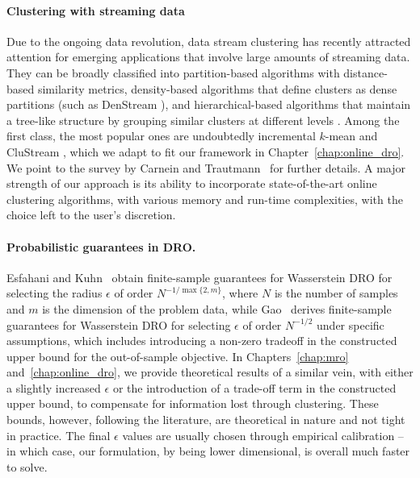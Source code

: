 \paragraph{Clustering with streaming data}
Due to the ongoing data revolution, data stream clustering has recently attracted attention for emerging applications that involve large amounts of streaming data.
They can be broadly classified into partition-based algorithms with distance-based similarity metrics, density-based algorithms that define clusters as dense partitions (such as DenStream \cite{cao2006density}), and hierarchical-based algorithms that maintain a tree-like structure by grouping similar clusters at different levels \cite{murtagh2012algorithms}. Among the first class, the most popular ones are undoubtedly incremental $k$-mean \cite{aaron2014dynamic} and CluStream \cite{clustream}, which we adapt to fit our framework in Chapter~\ref{chap:online_dro}.
We point to the survey by Carnein and Trautmann~\cite{streaming} for further details. 
A major strength of our approach is its ability to incorporate state-of-the-art online clustering algorithms, with various memory and run-time complexities, with the choice left to the user's discretion. 


\paragraph{Probabilistic guarantees in \gls{DRO}.}
Esfahani and Kuhn~\cite{mohajerin_esfahani_data-driven_2018} obtain finite-sample guarantees for Wasserstein \gls{DRO} for selecting the radius $\epsilon$ of order $N^{-1/\max\{2,m\}}$, where $N$ is the number of samples and $m$ is the dimension of the problem data, while Gao~\cite{DBLP:gao2020} derives finite-sample guarantees for Wasserstein \gls{DRO} for selecting $\epsilon$ of order $N^{-1/2}$ under specific assumptions, which includes introducing a non-zero tradeoff in the constructed upper bound for the out-of-sample objective.
In Chapters~\ref{chap:mro} and~\ref{chap:online_dro}, we provide theoretical results of a similar vein, with either a slightly increased $\epsilon$ or the introduction of a trade-off term in the constructed upper bound, to compensate for information lost through clustering.
These bounds, however, following the literature, are theoretical in nature and not tight in practice.
The final $\epsilon$ values are usually chosen through empirical calibration -- in which case, our formulation, by being lower dimensional, is overall much faster to solve.


